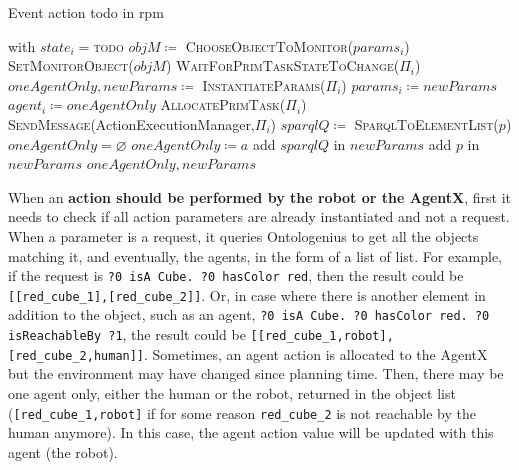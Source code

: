 \documentclass[a4paper,11pt,twoside]{StyleThese}
\begin{document}
\begin{algorithm}[!htb]
	\caption{Event action todo in \acrshort{rpm}}
	\label{chap6:algo:todo}
	\begin{algorithmic}
	 with $state_i=$\textsc{todo}
	\State $objM \coloneqq$ \textsc{ChooseObjectToMonitor($params_i$)}
	\State \textsc{SetMonitorObject($objM$)}
	\State \textsc{WaitForPrimTaskStateToChange($\Pi_i$)}
		\State $oneAgentOnly,newParams\coloneqq$ \textsc{InstantiateParams}($\Pi_i$)
		\State $params_i \coloneqq newParams$
		\EndIf
			\State $agent_i \coloneqq oneAgentOnly$ 
		\Else
			\State \textsc{AllocatePrimTask}($\Pi_i$)
			 \State \textsc{SendMessage}(ActionExecutionManager,$\Pi_i$)
			 \EndIf
		\EndIf
	\EndIf
	\EndFunction
	\Statex
		\State $sparqlQ \coloneqq$ \textsc{SparqlToElementList($p$)} 
		\State $oneAgentOnly = \varnothing$
			\State $oneAgentOnly \coloneqq a$
		\EndIf
		\State add $sparqlQ$ in $newParams$
	\Else
		\State add $p$ in $newParams$
	\EndIf
	\EndFor
	\State \Return $oneAgentOnly,newParams$
	\EndFunction
\end{algorithmic}
\end{algorithm}

When an \textbf{action should be performed by the robot or the AgentX}, first it needs to check if all action parameters are already instantiated and not a \sparql{} request. When a parameter is a \sparql{} request, it queries Ontologenius to get all the objects matching it, and eventually, the agents, in the form of a list of list. For example, if the \sparql{} request is \verb'?0 isA Cube. ?0 hasColor red', then the result could be \verb'[[red_cube_1],[red_cube_2]]'. Or, in case where there is another element in addition to the object, such as an agent, \eg \verb'?0 isA Cube. ?0 hasColor red. ?0 isReachableBy ?1', the result could be \verb'[[red_cube_1,robot],[red_cube_2,human]]'. Sometimes, an agent action is allocated to the AgentX but the environment may have changed since planning time. Then, there may be one agent only, either the human or the robot, returned in the object list (\eg \verb'[red_cube_1,robot]' if for some reason \verb'red_cube_2' is not reachable by the human anymore). In this case, the agent action value will be updated with this agent (\eg the robot). 
\end{document}
